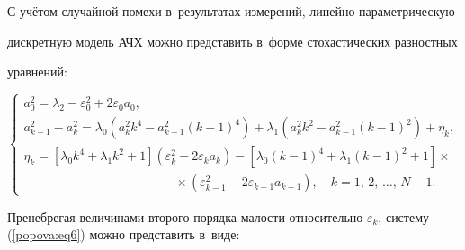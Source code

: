 С учётом случайной помехи в~результатах измерений, линейно параметрическую 


дискретную модель АЧХ можно представить в~форме стохастических разностных 


уравнений:


\begin{equation}


\label{popova:eq6}


\left\{ \begin{array}{l}


 a_0^2 = \lambda _2 - \varepsilon _0^2 + 2\varepsilon _0 a_0 , \\ 


 a_{k - 1}^2 - a_k^2 = \lambda _0 \left( {a_k^2 k^4 - a_{k - 1}^2 (k - 1)^4} 


\right) + \lambda _1 \left( {a_k^2 k^2 - a_{k - 1}^2 (k - 1)^2} \right) + 


\eta _k , \\ 


 \eta _k = \left[ {\lambda _0 k^4 + \lambda _1 k^2 + 1} \right]\left( 


{\varepsilon _k^2 - 2\varepsilon _k a_k } \right) - \left[ {\lambda _0 (k - 1)^4 + \lambda _1 (k - 1)^2 + 1} \right]\times\\ 


\qquad \qquad   \qquad \qquad  \qquad \qquad \times\left( 


{\varepsilon _{k - 1}^2 - 2\varepsilon _{k - 1} a_{k - 1} } \right),


\quad k = 1,\,2,\,\dots,\, N - 1.


 \end{array} \right.


\end{equation}








Пренебрегая величинами второго порядка малости относительно $\varepsilon _k 


$, систему (\ref{popova:eq6}) можно представить в~виде:


